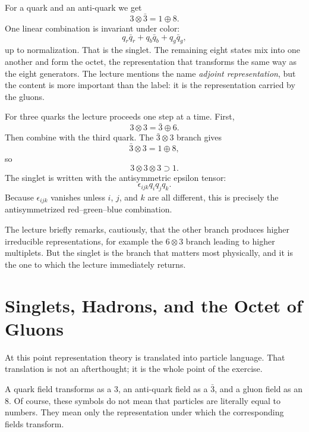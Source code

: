 For a quark and an anti-quark we get
\begin{equation}
3\otimes\bar 3 = 1\oplus8.
\end{equation}
One linear combination is invariant under color:
\begin{equation}
q_r\bar q_r + q_b\bar q_b + q_g\bar q_g,
\end{equation}
up to normalization. That is the singlet. The remaining eight states mix into one another and form the octet, the representation that transforms the same way as the eight generators. The lecture mentions the name \emph{adjoint representation}, but the content is more important than the label: it is the representation carried by the gluons.

For three quarks the lecture proceeds one step at a time. First,
\begin{equation}
3\otimes3=\bar 3\oplus6.
\end{equation}
Then combine with the third quark. The \(\bar 3\otimes3\) branch gives
\begin{equation}
\bar 3\otimes3 = 1\oplus8,
\end{equation}
so
\begin{equation}
3\otimes3\otimes3 \supset 1.
\end{equation}
The singlet is written with the antisymmetric epsilon tensor:
\begin{equation}
\epsilon_{ijk}q_i q_j q_k.
\end{equation}
Because \(\epsilon_{ijk}\) vanishes unless \(i\), \(j\), and \(k\) are all different, this is precisely the antisymmetrized red--green--blue combination.

The lecture briefly remarks, cautiously, that the other branch produces higher irreducible representations, for example the \(6\otimes3\) branch leading to higher multiplets. But the singlet is the branch that matters most physically, and it is the one to which the lecture immediately returns.

\section{Singlets, Hadrons, and the Octet of Gluons}

At this point representation theory is translated into particle language. That translation is not an afterthought; it is the whole point of the exercise.

A quark field transforms as a \(3\), an anti-quark field as a \(\bar 3\), and a gluon field as an \(8\). Of course, these symbols do not mean that particles are literally equal to numbers. They mean only the representation under which the corresponding fields transform.

